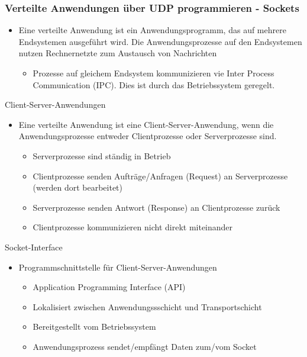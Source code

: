     \subsubsection{Verteilte Anwendungen über UDP programmieren - Sockets}
      \begin{itemize}
        \item Eine verteilte Anwendung ist ein Anwendungsprogramm, das auf mehrere Endsystemen
          ausgeführt wird. Die Anwendungsprozesse auf den Endsystemen nutzen Rechnernetzte zum Austausch
          von Nachrichten
          \begin{itemize}
            \item Prozesse auf gleichem Endsystem kommunizieren vie Inter Process Communication (IPC).
              Dies ist durch das Betriebssystem geregelt.
          \end{itemize}
      \end{itemize}
      Client-Server-Anwendungen
      \begin{itemize}
        \item Eine verteilte Anwendung ist eine Client-Server-Anwendung, wenn die Anwendungsprozesse
          entweder Clientprozesse oder Serverprozesse sind.
          \begin{itemize}
            \item Serverprozesse sind ständig in Betrieb
            \item Clientprozesse senden Aufträge/Anfragen (Request) an Serverprozesse (werden dort
              bearbeitet)
            \item Serverprozesse senden Antwort (Response) an Clientprozesse zurück
            \item Clientprozesse kommunizieren nicht direkt miteinander
          \end{itemize}
      \end{itemize}
      Socket-Interface
      \begin{itemize}
        \item Programmschnittstelle für Client-Server-Anwendungen
          \begin{itemize}
            \item Application Programming Interface (API)
            \item Lokalisiert zwischen Anwendungssschicht und Transportschicht
            \item Bereitgestellt vom Betriebssystem
            \item Anwendungsprozess sendet/empfängt Daten zum/vom Socket
          \end{itemize}
      \end{itemize}
